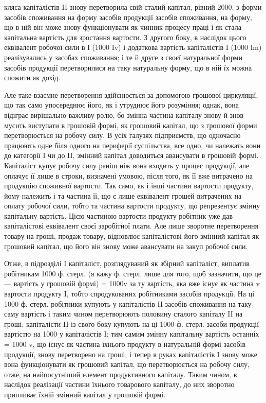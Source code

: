 \parcont{}  %
кляса капіталістів II знову перетворила свій сталий капітал, рівний 2000,
з форми засобів споживання на форму засобів продукції засобів споживання,
на форму, що в ній він може знову функціонувати як чинник
процесу праці і як стала капітальна вартість для зростання вартости. З
другого боку, в наслідок цього еквівалент робочої сили в І (1000 Iv)
і додаткова вартість капіталістів I (1000 Іm) реалізувались у засобах
споживання; і те й друге з своєї натуральної форми засобів продукції перетворилися
на таку натуральну форму, що в ній їх можна спожити як дохід.

Але таке взаємне перетворення здійснюється за допомогою грошової
циркуляції, що так само упосереднює його, як і утруднює його розуміння;
однак, вона відіграє вирішально важливу ролю, бо змінна частина капіталу
знову й знов мусить виступати в грошовій формі, як грошовий капітал,
що з грошової форми перетворюється на робочу силу. В усіх галузях
підприємств, що одночасно працюють одне біля одного на периферії
суспільства, все одно, чи належать вони до категорії I чи до II, змінний
капітал доводиться авансувати в грошовій формі. Капіталіст купує
робочу силу раніш ніж вона входить у процес продукції, але оплачує її
лише в строки, визначені умовою, після того, як її вже витрачено на
продукцію споживної вартости. Так само, як і інші частини вартости
продукту, йому належить і та частина її, що є лише еквівалент грошей
витрачених на оплату робочої сили, тобто та частина вартости продукту,
що репрезентує змінну капітальну вартість. Цією частиною вартости продукту
робітник уже дав капіталістові еквівалент своєї заробітної плати. Але
лише зворотне перетворення товару на гроші, продаж товару, відновлює
капіталістові його змінний капітал як грошовий капітал, що його він
знову може авансувати на закуп робочої сили.

Отже, в підрозділі I капіталіст, розглядуваний як збірний капіталіст,
виплатив робітникам 1000 ф. стерл. (я кажу ф. стерл. лише для того,
щоб зазначити, що це — вартість у грошовій формі) = 1000v за
ту вартість, яка вже існує як частина v вартости продукту I, тобто спродукованих
робітниками засобів продукції. На ці 1000 ф. стерл. робітники
купують у капіталістів II засобів споживання на таку саму вартість і таким
чином перетворюють половину сталого капіталу II на гроші; капіталісти II
із свого боку купують на ці 1000 ф. стерл. засоби продукції вартістю
на 1000 у капіталістів I; тим самим змінну капітальну вартість останніх
= 1000 v, що існує як частина їхнього продукту в натуральній формі
засобів продукції, знову перетворено на гроші, і тепер в руках капіталістів
І знову може вона функціонувати як грошовий капітал, що перетворюється
на робочу силу, отже, на найпосутніший елемент продуктивного
капіталу. Таким чином, в наслідок реалізації частини їхнього товарового
капіталу, до них зворотно припливає їхній змінний капітал у
грошовій формі.

